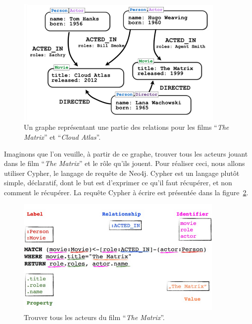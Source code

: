 		\begin{figure}[H]
			\centering
			\includegraphics[width=0.9\textwidth]{images/graphe.png}
			\caption{Un graphe représentant une partie des relations pour les films \enquote{\textit{The Matrix}} et \enquote{\textit{Cloud Atlas}}.\cite{grapheNeo4j}}
			\label{grapheNeo4j}
		\end{figure}

		Imaginons que l'on veuille, à partir de ce graphe, trouver tous les acteurs jouant dans le film \enquote{\textit{The Matrix}} et le rôle qu'ils jouent. Pour réaliser ceci, nous allons utiliser Cypher, le langage de requête de Neo4j. Cypher est un langage plutôt simple, déclaratif, dont le but est d'exprimer ce qu'il faut récupérer, et non comment le récupérer. La requête Cypher à écrire est présentée dans la figure~\ref{requeteNeo4j}.

		\begin{figure}[H]
			\centering
			\includegraphics[width=0.9\textwidth]{images/requeteNeo4j.png}
			\caption{Trouver tous les acteurs du film \enquote{\textit{The Matrix}}.\cite{grapheNeo4j}}
			\label{requeteNeo4j}
		\end{figure}

